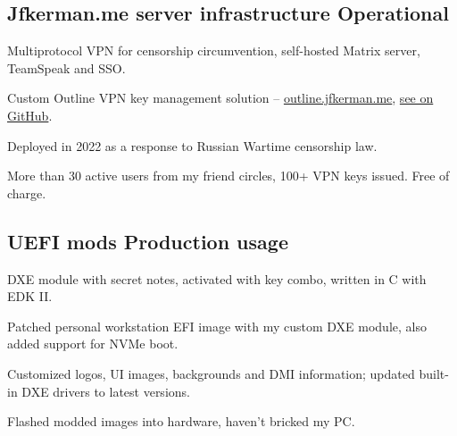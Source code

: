 \documentclass[letter,10pt]{article}
\begin{document}
\subsection{{Jfkerman.me server infrastructure \hfill Operational}}
\begin{zitemize}
\item Multiprotocol VPN for censorship circumvention, self-hosted Matrix server, TeamSpeak and SSO.
\item Custom Outline VPN key management solution -- \url{outline.jfkerman.me}, \href{https://github.com/ThePetrovich/jfkerman_outline}{see on GitHub}. 
\item Deployed in 2022 as a response to Russian Wartime censorship law.
\item More than 30 active users from my friend circles, 100+ VPN keys issued. Free of charge.
\end{zitemize}

\subsection{{UEFI mods \hfill Production usage}}
\begin{zitemize}
\item DXE module with secret notes, activated with key combo, written in C with EDK II.
\item Patched personal workstation EFI image with my custom DXE module, also added support for NVMe boot.
\item Customized logos, UI images, backgrounds and DMI information; updated built-in DXE drivers to latest versions. 
\item Flashed modded images into hardware, haven't bricked my PC.
\end{zitemize}
\end{document}
